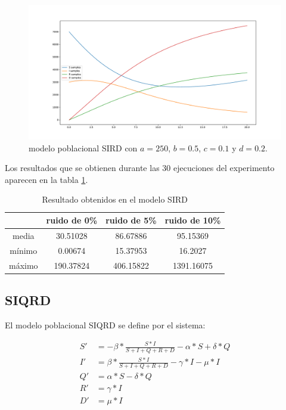 \begin{figure}[h]
    \centering
    \includegraphics[width=\textwidth]{"figures/SIRD.pdf"}
    \caption{modelo poblacional SIRD con $a = 250$, $b = 0.5$, $c = 0.1$ y $d = 0.2$.}
    \label{fig:SIRD}
\end{figure}

Los resultados que se obtienen durante las 30 ejecuciones del experimento aparecen en la tabla \ref{table:experiment_SIRD}.

\begin{table}[!h]
    \centering
    \caption{Resultado obtenidos en el modelo SIRD}
    \begin{tabular}{|c|c|c|c|}
        \hline
               & \textbf{ruido de 0\%} & \textbf{ruido de 5\%} & \textbf{ruido de 10\%} \\
        \hline
        media  & 30.51028              & 86.67886              & 95.15369               \\
        \hline
        mínimo & 0.00674               & 15.37953              & 16.2027                \\
        \hline
        máximo & 190.37824             & 406.15822             & 1391.16075             \\
        \hline
    \end{tabular}
    \label{table:experiment_SIRD}
\end{table}

\subsection{SIQRD}

El modelo poblacional SIQRD se define por el sistema:

\begin{align*}
    S' & = -\beta * \frac{S * I}{S + I + Q + R + D} - \alpha * S + \delta * Q \\
    I' & = \beta * \frac{S * I}{S + I + Q + R + D} - \gamma * I - \mu * I     \\
    Q' & = \alpha * S - \delta * Q                                            \\
    R' & = \gamma * I                                                         \\
    D' & = \mu * I
\end{align*}

